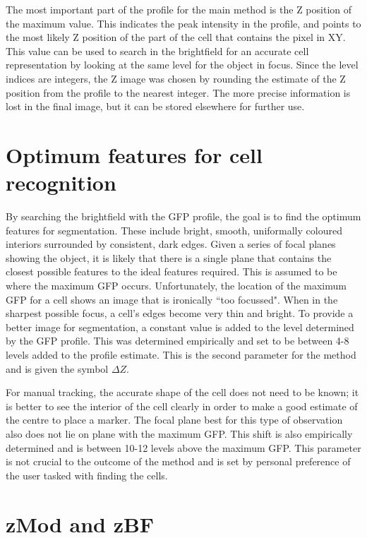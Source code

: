 The most important part of the profile for the main method is the Z position of the maximum value. This indicates the peak intensity in the profile, and points to the most likely Z position of the part of the cell that contains the pixel in XY. This value can be used to search in the brightfield for an accurate cell representation by looking at the same level for the object in focus. Since the level indices are integers, the Z image was chosen by rounding the estimate of the Z position from the profile to the nearest integer. The more precise information is lost in the final image, but it can be stored elsewhere for further use.

\section{Optimum features for cell recognition}

By searching the brightfield with the GFP profile, the goal is to find the optimum features for segmentation. These include bright, smooth, uniformally coloured interiors surrounded by consistent, dark edges. Given a series of focal planes showing the object, it is likely that there is a single plane that contains the closest possible features to the ideal features required. This is assumed to be where the maximum GFP occurs. Unfortunately, the location of the maximum GFP for a cell shows an image that is ironically ``too focussed". When in the sharpest possible focus, a cell's edges become very thin and bright. To provide a better image for segmentation, a constant value is added to the level determined by the GFP profile. This was determined empirically and set to be between 4-8 levels added to the profile estimate. This is the second parameter for the method and is given the symbol $\Delta Z$.

For manual tracking, the accurate shape of the cell does not need to be known; it is better to see the interior of the cell clearly in order to make a good estimate of the centre to place a marker. The focal plane best for this type of observation also does not lie on plane with the maximum GFP. This shift is also empirically determined and is between 10-12 levels above the maximum GFP. This parameter is not crucial to the outcome of the method and is set by personal preference of the user tasked with finding the cells.

\section{zMod and zBF}


